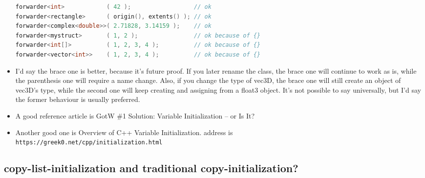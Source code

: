 \documentclass[a4paper,11pt,twoside]{book}
\begin{document}
\begin{itemize}
\begin{lstlisting}[frame=single, language=c++,mathescape=true]
forwarder<int>            ( 42 );                  // ok
forwarder<rectangle>      ( origin(), extents() ); // ok
forwarder<complex<double>>( 2.71828, 3.14159 );    // ok
forwarder<mystruct>       ( 1, 2 );                // ok because of {}
forwarder<int[]>          ( 1, 2, 3, 4 );          // ok because of {}
forwarder<vector<int>>    ( 1, 2, 3, 4 );          // ok because of {}
\end{lstlisting}
	
	\item I'd say the brace one is better, because it's future proof. If you later rename the class, the brace one will continue to work as is, while the parenthesis one will require a name change. Also, if you change the type of vec3D, the brace one will still create an object of vec3D's type, while the second one will keep creating and assigning from a float3 object. It's not possible to say universally, but I'd say the former behaviour is usually preferred. 
	
	\item A good reference article is GotW \#1 Solution: Variable Initialization – or Is It?
	\item Another good one is Overview of C++ Variable Initialization. address is \\ \verb=https://greek0.net/cpp/initialization.html=
\end{itemize}

\subsection{copy-list-initialization and traditional copy-initialization?}
\end{document}
